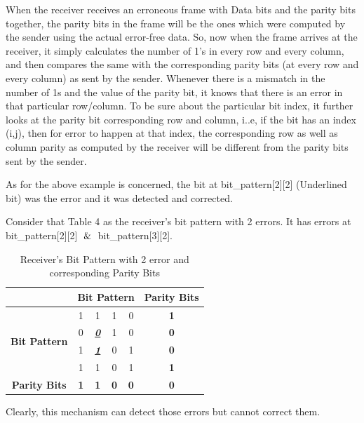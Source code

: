 \documentclass[12pt]{article}
\begin{document}
When the receiver receives an erroneous frame with Data bits and the parity bits together, the parity bits in the frame will be the ones which were computed by the sender using the actual error-free data. So, now when the frame arrives at the receiver, it simply calculates the number of 1's in every row and every column, and then compares the same with the corresponding parity bits (at every row and every column) as sent by the sender. Whenever there is a mismatch in the number of 1s and the value of the parity bit, it knows that there is an error in that particular row/column. To be sure about the particular bit index, it further looks at the parity bit corresponding row and column, i..e, if the bit has an index (i,j), then for error to happen at that index, the corresponding row as well as column parity as computed by the receiver will be different from the parity bits sent by the sender.

As for the above example is concerned, the bit at bit\_pattern[2][2] (Underlined bit) was the error and it was detected and corrected.

Consider that Table 4 as the receiver's bit pattern with 2 errors. It has errors at bit\_pattern[2][2] $\And$ bit\_pattern[3][2].
\begin{table}[]
\begin{center}
\begin{tabular}{|c|c|c|c|c|c|}
\hline
\multicolumn{1}{|l|}{}                & \multicolumn{4}{c|}{\textbf{Bit Pattern}}                        & \textbf{Parity Bits} \\ \hline
\multirow{4}{*}{\textbf{Bit Pattern}} & 1          & 1                         & 1          & 0          & \textbf{1}           \\ \cline{2-6} 
                                      & 0          & {\ul \textit{\textbf{0}}} & 1          & 0          & \textbf{0}           \\ \cline{2-6} 
                                      & 1          & {\ul \textit{\textbf{1}}} & 0          & 1          & \textbf{0}           \\ \cline{2-6} 
                                      & 1          & 1                         & 0          & 1          & \textbf{1}           \\ \hline
\textbf{Parity Bits}                  & \textbf{1} & \textbf{1}                & \textbf{0} & \textbf{0} & \textbf{0}           \\ \hline
\end{tabular}
\end{center}
\caption{Receiver's Bit Pattern with 2 error and corresponding Parity Bits}
\end{table}

Clearly, this mechanism can detect those errors but cannot correct them.

\end{document}

